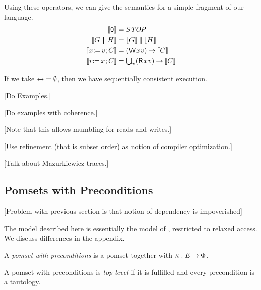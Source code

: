 Using these operators, we can give the semantics for a simple fragment of our
language.
\begin{align*}
  \sem{\NIL} &= \sSTOP
  \\
  \sem{\aGrp \PAR \bGrp} &= \sem{\aGrp}\sPAR\sem{\bGrp}
  \\
  \sem{\PW{\aLoc}{\aVal}\SEMI \aCmd} &= \textstyle\DWP{\aLoc}{\aVal}\sPREFIX\sem{\aCmd}
  \\
  \sem{\PR{\aLoc}{\aReg}\SEMI \aCmd} &= \textstyle\bigcup_{\aVal}\DRP{\aLoc}{\aVal}\sPREFIX\sem{\aCmd}
\end{align*}

If we take ${\mathrel\leftrightarrow} = \emptyset$, then we have sequentially consistent
execution.

[Do Examples.]

[Do examples with coherence.]

[Note that this allows mumbling for reads and writes.]

[Use refinement (that is subset order) as notion of compiler optimization.]

[Talk about Mazurkiewicz traces.]

\subsection{Pomsets with Preconditions}

[Problem with previous section is that notion of dependency is impoverished]

The model described here is essentially the model of
\cite{DBLP:journals/pacmpl/JagadeesanJR20}, restricted to relaxed access.  We
discuss differences in the appendix.

\begin{definition}
  A \emph{pomset with preconditions} is
  a pomset together with $\kappa:E\mathbin\rightarrow\Phi$.
\end{definition}

\begin{definition}
  A pomset with preconditions is \emph{top level} if it is fulfilled and
  every precondition is a tautology.
\end{definition}

